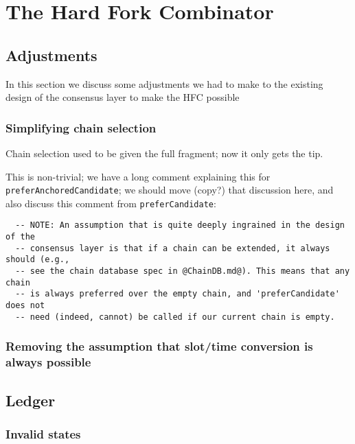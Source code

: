 \chapter{The Hard Fork Combinator}
\label{hfc}

\section{Adjustments}

In this section we discuss some adjustments we had to make to the existing
design of the consensus layer to make the HFC possible

\subsection{Simplifying chain selection}
\label{simplifying-chain-selection}

Chain selection used to be given the full fragment; now it only gets the tip.

This is non-trivial; we have a long comment explaining this for
\lstinline!preferAnchoredCandidate!; we should move (copy?) that discussion
here, and also discuss this comment from \lstinline!preferCandidate!:

\begin{lstlisting}
  -- NOTE: An assumption that is quite deeply ingrained in the design of the
  -- consensus layer is that if a chain can be extended, it always should (e.g.,
  -- see the chain database spec in @ChainDB.md@). This means that any chain
  -- is always preferred over the empty chain, and 'preferCandidate' does not
  -- need (indeed, cannot) be called if our current chain is empty.
\end{lstlisting}


\subsection{Removing the assumption that slot/time conversion is always possible}
\label{removing-known-slot-assumption}

\section{Ledger}

\subsection{Invalid states}
\label{hfc:ledger:invalid-states}

